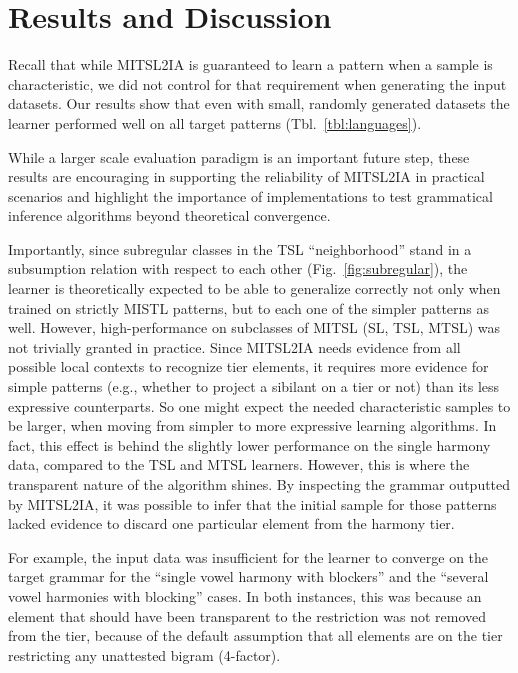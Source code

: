 \documentclass[11pt]{article}
\begin{document}
\section{Results and Discussion}

Recall that while MITSL2IA is guaranteed to learn a pattern when a sample is characteristic, we did not control for that requirement when generating the input datasets.
Our results show that even with small, randomly generated datasets the learner performed well on all target patterns (Tbl.\ \ref{tbl:languages}).

     While a larger scale evaluation paradigm is an important future step, these results are encouraging in supporting the reliability of MITSL2IA in practical scenarios and highlight the importance of implementations to test grammatical inference algorithms beyond theoretical convergence.\@
  
    Importantly, since subregular classes in the TSL ``neighborhood'' stand in a subsumption relation with respect to each other (Fig.\ \ref{fig:subregular}), the learner is theoretically expected to be able to generalize correctly not only when trained on strictly MISTL patterns, but to each one of the simpler patterns as well.
 However, high-performance on subclasses of MITSL (SL, TSL, MTSL) was not trivially granted in practice.\@
    Since MITSL2IA needs evidence from all possible local contexts to recognize tier elements, it requires more evidence for simple patterns (e.g., whether to project a sibilant on a tier or not) than its less expressive counterparts.\@
    So one might expect the needed characteristic samples to be larger, when moving from simpler to more expressive learning algorithms.
    In fact, this effect is behind the slightly lower performance on the single harmony data, compared to the TSL and MTSL learners.
    However, this is where the transparent nature of the algorithm shines.
    By inspecting the grammar outputted by MITSL2IA, it was possible to infer that the initial sample for those patterns lacked evidence to discard one particular element from the harmony tier.
    
    For example, the input data was insufficient for the learner to converge on the target grammar for the ``single vowel harmony with blockers'' and the ``several vowel harmonies with blocking'' cases.
    In both instances, this was because an element that should have been transparent to the restriction was not removed from the tier, because of the default assumption that all elements are on the tier restricting any unattested bigram (4-factor).
     
\end{document}
